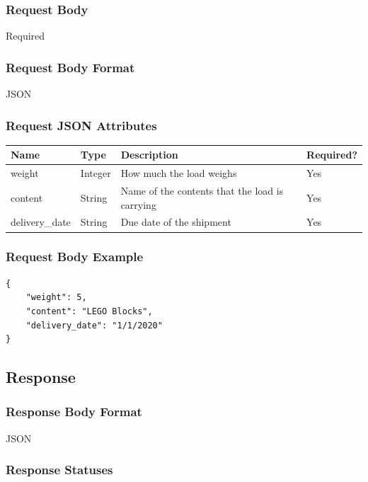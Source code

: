 \documentclass[letterpaper,11pt,titlepage,draftclsnofoot,onecolumn,compsoc,utf8,latin1]{IEEEtran}
\begin{document}
\begin{singlespace}
\subsubsection{Request Body}

Required

\subsubsection{Request Body Format}

JSON

\subsubsection{Request JSON Attributes}

\begin{center}
\begin{tabular}{ |p{}|p{}|p{}|p{}| } 
\hline
 \textbf{Name} & \textbf{Type} & \textbf{Description} & \textbf{Required?} \\  \hline
 weight & Integer & How much the load weighs & Yes  \\ \hline
 content & String & Name of the contents that the load is carrying & Yes \\ \hline 
 delivery\_date & String & Due date of the shipment & Yes \\
 \hline
\end{tabular}
\end{center}

\subsubsection{Request Body Example}

\begin{lstlisting}[]
{
    "weight": 5,
    "content": "LEGO Blocks",
    "delivery_date": "1/1/2020"
}
\end{lstlisting}

\subsection{Response}
\subsubsection{Response Body Format}

JSON

\subsubsection{Response Statuses}


\end{singlespace}
\end{document}
